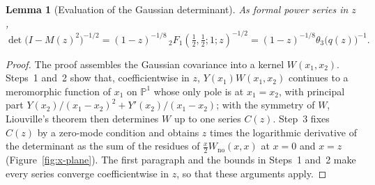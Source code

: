 \documentclass[twoside,10pt]{article}
\numberwithin{equation}{section}
\theoremstyle{slbody}
\newtheorem{lemma}[theorem]{Lemma}
\theoremstyle{definition}
\theoremstyle{remark}
\begin{document}
\begin{lemma}[Evaluation of the Gaussian determinant]
\label{lem:bergman-det}
As formal power series in \(z\),
\[
 \det\bigl(I-M(z)^2\bigr)^{-1/2}
 =(1-z)^{-1/8}\,{}_2F_1\!\left(\tfrac12,\tfrac12;1;z\right)^{-1/2}
 =(1-z)^{-1/8}\theta_3\bigl(q(z)\bigr)^{-1}.
\]
\end{lemma}

\begin{proof}
The proof assembles the Gaussian covariance into a kernel \(W(x_1,x_2)\).
Steps~1 and~2 show that, coefficientwise in \(z\), \(Y(x_1)W(x_1,x_2)\)
continues to a meromorphic function of \(x_1\) on \(\mathbb P^1\) whose only
pole is at \(x_1=x_2\), with principal part
\(Y(x_2)/(x_1-x_2)^2+Y'(x_2)/(x_1-x_2)\); with the symmetry of \(W\),
Liouville's theorem then determines \(W\) up to one series \(C(z)\).  Step~3
fixes \(C(z)\) by a zero-mode condition and obtains \(z\) times the
logarithmic derivative of the determinant as the sum of the residues of
\(\frac x2W_{\mathrm{no}}(x,x)\) at \(x=0\) and \(x=z\)
(Figure~\ref{fig:x-plane}).  The first paragraph and the bounds in
Steps~1 and~2 make every series converge coefficientwise in \(z\), so that
these arguments apply.


\end{proof}
\end{document}
